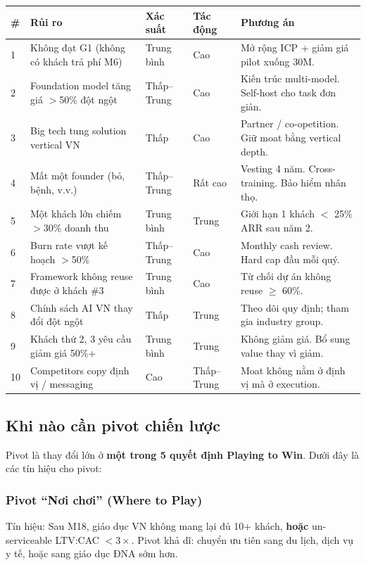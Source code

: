 \documentclass[11pt,a4paper]{article}
\begin{document}
\begin{tabularx}{\linewidth}{@{}p{0.5cm} p{4.5cm} p{1.8cm} p{1.5cm} X@{}}
\toprule
\textbf{\#} & \textbf{Rủi ro} & \textbf{Xác suất} & \textbf{Tác động} & \textbf{Phương án} \\
\midrule
1 & Không đạt G1 (không có khách trả phí M6) & Trung bình & Cao & Mở rộng ICP + giảm giá pilot xuống 30M. \\
2 & Foundation model tăng giá $>$50\% đột ngột & Thấp--Trung & Cao & Kiến trúc multi-model. Self-host cho task đơn giản. \\
3 & Big tech tung solution vertical VN & Thấp & Cao & Partner / co-opetition. Giữ moat bằng vertical depth. \\
4 & Mất một founder (bỏ, bệnh, v.v.) & Thấp--Trung & Rất cao & Vesting 4 năm. Cross-training. Bảo hiểm nhân thọ. \\
5 & Một khách lớn chiếm $>$30\% doanh thu & Trung bình & Trung & Giới hạn 1 khách $<$ 25\% ARR sau năm 2. \\
6 & Burn rate vượt kế hoạch $>$50\% & Thấp--Trung & Cao & Monthly cash review. Hard cap đầu mỗi quý. \\
7 & Framework không reuse được ở khách \#3 & Trung bình & Cao & Từ chối dự án không reuse $\geq$ 60\%. \\
8 & Chính sách AI VN thay đổi đột ngột & Thấp & Trung & Theo dõi quy định; tham gia industry group. \\
9 & Khách thứ 2, 3 yêu cầu giảm giá 50\%+ & Trung bình & Trung & Không giảm giá. Bổ sung value thay vì giảm. \\
10 & Competitors copy định vị / messaging & Cao & Thấp--Trung & Moat không nằm ở định vị mà ở execution. \\
\bottomrule
\end{tabularx}

\subsection{Khi nào cần pivot chiến lược}

Pivot là thay đổi lớn ở \textbf{một trong 5 quyết định Playing to Win}. Dưới đây
là các tín hiệu cho pivot:

\subsubsection*{Pivot ``Nơi chơi'' (Where to Play)}

Tín hiệu: Sau M18, giáo dục VN không mang lại đủ 10+ khách, \textbf{hoặc}
un-serviceable LTV:CAC $< 3\times$. Pivot khả dĩ: chuyển ưu tiên sang du lịch,
dịch vụ y tế, hoặc sang giáo dục ĐNA sớm hơn.
\end{document}
